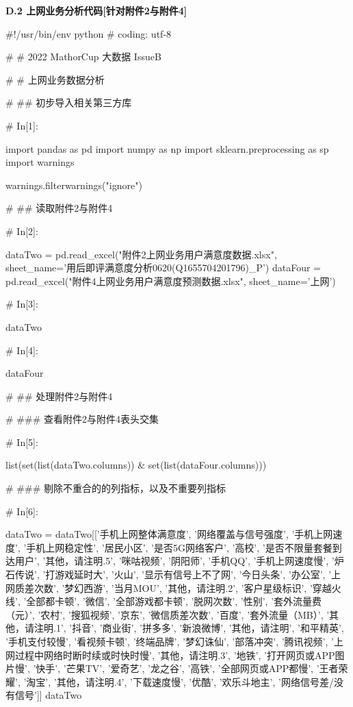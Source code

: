 \documentclass{MathorCupmodeling}
\begin{document}
\newpage
\textbf{D.2 上网业务分析代码[针对附件2与附件4]}
\begin{python}
	#!/usr/bin/env python
	# coding: utf-8
	
	# # 2022 MathorCup 大数据 IssueB
	
	# # 上网业务数据分析
	
	# ## 初步导入相关第三方库
	
	# In[1]:
	
	
	import pandas as pd
	import numpy as np
	import sklearn.preprocessing as sp
	import warnings
	
	warnings.filterwarnings("ignore")
	
	# ## 读取附件2与附件4
	
	# In[2]:
	
	
	dataTwo = pd.read_excel("附件2上网业务用户满意度数据.xlsx", sheet_name='用后即评满意度分析0620(Q1655704201796)_P')
	dataFour = pd.read_excel("附件4上网业务用户满意度预测数据.xlsx", sheet_name='上网')
	
	# In[3]:
	
	
	dataTwo
	
	# In[4]:
	
	
	dataFour
	
	# ## 处理附件2与附件4
	
	# ### 查看附件2与附件4表头交集
	
	# In[5]:
	
	
	list(set(list(dataTwo.columns)) & set(list(dataFour.columns)))
	
	# ### 剔除不重合的的列指标，以及不重要列指标
	
	# In[6]:
	
	
	dataTwo = dataTwo[['手机上网整体满意度', '网络覆盖与信号强度', '手机上网速度', '手机上网稳定性', '居民小区', '是否5G网络客户', '高校', '是否不限量套餐到达用户', '其他，请注明.5', '咪咕视频', '阴阳师', '手机QQ', '手机上网速度慢', '炉石传说', '打游戏延时大', '火山', '显示有信号上不了网', '今日头条', '办公室', '上网质差次数', '梦幻西游', '当月MOU', '其他，请注明.2', '客户星级标识', '穿越火线', '全部都卡顿', '微信', '全部游戏都卡顿', '脱网次数', '性别', '套外流量费（元）', '农村', '搜狐视频', '京东', '微信质差次数', '百度', '套外流量（MB）', '其他，请注明.1', '抖音', '商业街', '拼多多', '新浪微博', '其他，请注明', '和平精英', '手机支付较慢', '看视频卡顿', '终端品牌', '梦幻诛仙', '部落冲突', '腾讯视频', '上网过程中网络时断时续或时快时慢', '其他，请注明.3', '地铁', '打开网页或APP图片慢', '快手', '芒果TV', '爱奇艺', '龙之谷', '高铁', '全部网页或APP都慢', '王者荣耀', '淘宝', '其他，请注明.4', '下载速度慢', '优酷', '欢乐斗地主', '网络信号差/没有信号']]
	dataTwo
	

\end{python}
\end{document}
